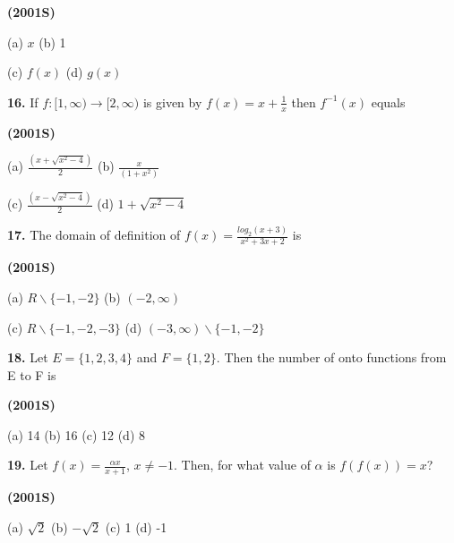 \documentclass[journal,12pt,twocolumn]{IEEEtran}
\theoremstyle{remark}
\begin{document}
\hfill{\textbf{(2001S)}}

\begin{tabbing}
	(a) $x$ \hspace{.8em} (b) 1
\end{tabbing}

\begin{tabbing}
	(c) $f(x)$ \hspace{.8em} (d) $g(x)$
\end{tabbing}

\textbf{16.} If $f:[1,\infty)\to[2,\infty)$ is given by $f(x)=x+\frac{1}{x}$ then $f^{-1}(x)$ equals

\hfill{\textbf{(2001S)}}

\begin{tabbing}
	(a) $\frac{(x+\sqrt{x^{2}-4})}{2}$ \hspace{.8em} (b) $\frac{x}{(1+x^{2})}$
\end{tabbing}

\begin{tabbing}
	(c) $\frac{(x-\sqrt{x^{2}-4})}{2}$ \hspace{.8em} (d) $1+\sqrt{x^{2}-4}$
\end{tabbing}

\textbf{17.} The domain of definition of $f(x)=\frac{log_{2}{(x+3)}}{x^{2}+3x+2}$ is

\hfill{\textbf{(2001S)}}

\begin{tabbing}
	(a) $R \backslash \{-1,-2\}$ \hspace{.8em} (b) $(-2,\infty)$
\end{tabbing}

\begin{tabbing}
	(c) $R \backslash \{-1,-2,-3\}$ \hspace{.8em} (d) $(-3,\infty)\backslash\{-1,-2\}$
\end{tabbing}

\textbf{18.} Let $E=\{1,2,3,4\}$ and $F=\{1,2\}$. Then the number of onto functions from E to F is

\hfill{\textbf{(2001S)}}

\begin{tabbing}
	(a) 14 \hspace{.8em} (b) 16 \hspace{.8em} (c) 12 \hspace{.8em} (d) 8
\end{tabbing}

\textbf{19.} Let $f(x)=\frac{\alpha x}{x+1}$, $x\neq-1$. Then, for what value of $\alpha$ is $f(f(x))=x$?

\hfill{\textbf{(2001S)}}

\begin{tabbing}
	(a) $\sqrt{2}$ \hspace{.8em} (b) $-\sqrt{2}$ \hspace{.8em} (c) 1 \hspace{.8em} (d) -1
\end{tabbing}
\end{document}
